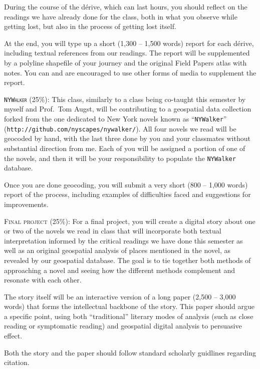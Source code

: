 \begin{description}
    During the course of the dérive, which can last hours, you should reflect
    on the readings we have already done for the class, both in what you
    observe while getting lost, but also in the process of getting lost itself.
    
    At the end, you will type up a short (1,300 -- 1,500 words) report for each
    dérive, including textual references from our readings. The report will be
    supplemented by a polyline shapefile of your journey and the original Field
    Papers atlas with notes. You can and are encouraged to use other forms of
    media to supplement the report.

  \item \textsc{\texttt{NYWalker} (25\%):} This class, similarly to a class
    being co-taught this semester by myself and Prof.\ Tom Augst, will be
    contributing to a geospatial data collection forked from the one dedicated
    to New York novels known as “\texttt{NYWalker}”
    (\texttt{http://github.com/nyscapes/nywalker/}).  All four novels we read
    will be geocoded by hand, with the last three done by you and your
    classmates without substantial direction from me. Each of you will be
    assigned a portion of one of the novels, and then it will be your
    responsibility to populate the \texttt{NYWalker} database.

    Once you are done geocoding, you will submit a very short (800 -- 1,000
    words) report of the process, including examples of difficulties faced and
    suggestions for improvements.

  \item \textsc{Final project (25\%):} For a final project, you will create a
    digital story about one or two of the novels we read in class that will
    incorporate both textual interpretation informed by the critical readings
    we have done this semester as well as an original geospatial analysis of
    places mentioned in the novel, as revealed by our geospatial database. The
    goal is to tie together both methods of approaching a novel and seeing how
    the different methods complement and resonate with each other.

    The story itself will be an interactive version of a long paper (2,500 --
    3,000 words) that forms the intellectual backbone of the story. This paper
    should argue a specific point, using both “traditional” literary modes of
    analysis (such as close reading or symptomatic reading) and geospatial
    digital analysis to persuasive effect.

    Both the story and the paper should follow standard scholarly guidlines
    regarding citation.

\end{description}
